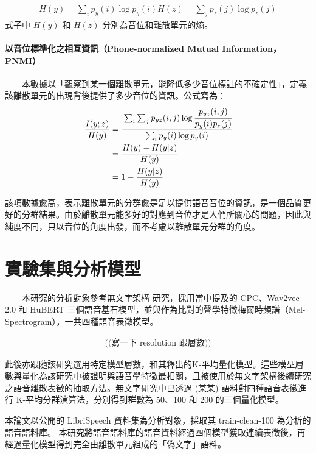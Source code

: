     \begin{align}
        H(y) = \sum_i{p_y(i)\log p_y(i)}
        H(z) = \sum_j{p_z(j)\log p_z(j)}
    \end{align}
式子中 $H(y)$ 和 $H(z)$ 分別為音位和離散單元的熵。

\paragraph{以音位標準化之相互資訊（Phone-normalized Mutual Information，PNMI）}

　　本數據以「觀察到某一個離散單元，能降低多少音位標註的不確定性」，定義該離散單元的出現背後提供了多少音位的資訊。公式寫為：
    \begin{align}
        \frac{I(y;z)}{H(y)}&=\cfrac{\sum_i \sum_j p_{yz}(i, j) \log \cfrac{p_{yz}(i, j)}{p_y(i)p_z(j)}}{\sum_i p_y(i) \log p_y(i)} \\
        &=\frac{H(y)-H(y|z)}{H(y)} \\
        &=1-\frac{H(y|z)}{H(y)}
    \end{align}

        該項數據愈高，表示離散單元的分群愈是足以提供語音音位的資訊，是一個品質更好的分群結果。由於離散單元能多好的對應到音位才是人們所關心的問題，因此與純度不同，只以音位的角度出發，而不考慮以離散單元分群的角度。




\section{實驗集與分析模型}

　　本研究的分析對象參考無文字架構 \cite{noauthor_textless_2021, lakhotia_generative_2021, lakhotia_generative_2021-1}  研究，採用當中提及的 CPC、Wav2vec 2.0 和 HuBERT 三個語音基石模型，並與作為比對的聲學特徵梅爾時頻譜（Mel-Spectrogram），一共四種語音表徵模型。

    \begin{align}
        \text{((寫一下 resolution 跟層數))}
    \end{align}

此後亦跟隨該研究選用特定模型層數，和其釋出的K-平均量化模型。這些模型層數與量化為該研究中被證明與語音學特徵最相關，且被使用於無文字架構後續研究之語音離散表徵的抽取方法。無文字研究中已透過 (某某) 語料對四種語音表徵進行 K-平均分群演算法，分別得到群數為 50、100 和 200 的三個量化模型。

        本論文以公開的 LibriSpeech 資料集為分析對象，採取其 train-clean-100 為分析的語音語料庫。
本研究將語音語料庫的語音資料經過四個模型獲取連續表徵後，再經過量化模型得到完全由離散單元組成的「偽文字」語料。

